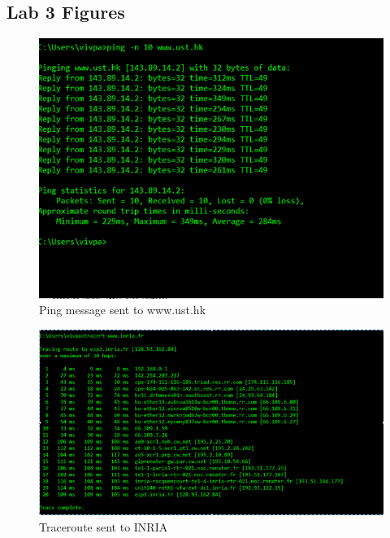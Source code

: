 \documentclass[10pt]{IEEEtran}
\begin{document}
 \pagebreak

\begin{appendix}

\subsection{Lab 3 Figures}
\begin{figure}[h!]
	\includegraphics[width=\linewidth]{Ping.png}
	\caption{Ping message sent to www.ust.hk}
\end{figure}

\begin{figure}[h!]
	\includegraphics[width=\linewidth]{tracert.png}
	\caption{Traceroute sent to INRIA}
\end{figure}

\end{appendix}

 
  
 
\end{document}
